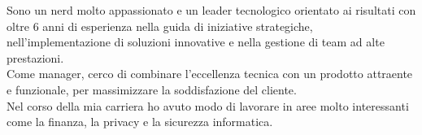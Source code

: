 
\begin{cvparagraph}
    Sono un nerd molto appassionato e un leader tecnologico orientato ai risultati con oltre 6 anni di esperienza nella guida di iniziative strategiche, nell'implementazione di soluzioni innovative e nella gestione di team ad alte prestazioni.
    \\Come manager, cerco di combinare l'eccellenza tecnica con un prodotto attraente e funzionale, per massimizzare la soddisfazione del cliente.
    \\Nel corso della mia carriera ho avuto modo di lavorare in aree molto interessanti come la finanza, la privacy e la sicurezza informatica.
\end{cvparagraph}